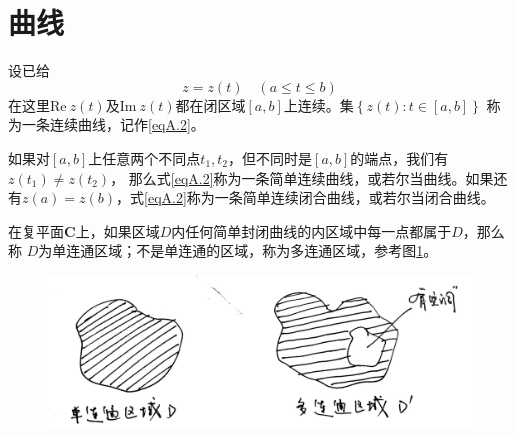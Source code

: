 \documentclass[lang=cn,10pt]{elegantbook}
\begin{document}
\section{曲线}
\begin{definition}
	设已给
	\begin{equation}\label{eqA.2}
		z=z(t)\quad(a\leq t \leq b)
	\end{equation}
	在这里Re$~z(t)$及Im$~z(t)$都在闭区域$[a,b]$上连续。集$\left\{z(t):t\in\left[a,b\right]\right\}$
	称为一条连续曲线，记作\ref{eqA.2}。

	如果对$[a,b]$上任意两个不同点$t_1,t_2$，但不同时是$[a,b]$的端点，我们有$z(t_1)\neq z(t_2)$，
	那么式\ref{eqA.2}称为一条简单连续曲线，或若尔当曲线。如果还有$z(a)= z(b)$，式\ref{eqA.2}称为一条简单连续闭合曲线，或若尔当闭合曲线。
\end{definition}

\begin{definition}[连通区域]
	在复平面$\mathbf{C}$上，如果区域$D$内任何简单封闭曲线的内区域中每一点都属于$D$，那么称
	$D$为单连通区域；不是单连通的区域，称为多连通区域，参考图\ref{imA_2}。
\end{definition}

\begin{figure}[h]
	\centering
	\includegraphics[scale=0.1]{image/A_2.jpg}
	\caption{}
	\label{imA_2}
\end{figure}
\end{document}
